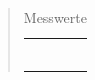 \begin{quote}
\begin{table}[h]
\begin{addmargin}[-1cm]{3cm}
\begin{tabular}{|p{3cm}|p{3cm}|p{10.2cm}|}
                                 &           &                  \\ 
                                 &           &                  \\
                                 &           &                  \\ 
                                 &           &                  \\
                                 &           &                  \\ 
                                 &           &                  \\
         \hline

                           \end{tabular}
                    \end{addmargin}
             \caption{Messwerte}
         \label{Messwerte2}
      \end{table}
      
      \vspace{2em}
      

\end{quote}
